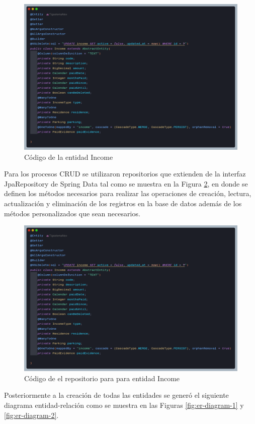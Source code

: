 \begin{figure}[H]
    \centering
    \includegraphics[width=1\textwidth]{resources/images/entity}
    \caption{Código de la entidad Income}
    \label{fig:entity}
\end{figure}

Para los procesos CRUD se utilizaron repositorios que extienden de la interfaz JpaRepository de Spring Data  tal como se muestra en la Figura \ref{fig:repository}, en donde se definen los métodos necesarios para realizar las operaciones de creación, lectura, actualización y eliminación de los registros en la base de datos además de los métodos personalizados que sean necesarios.

\begin{figure}[H]
    \centering
    \includegraphics[width=1\textwidth]{resources/images/entity}
    \caption{Código de el repositorio para para entidad Income}
    \label{fig:repository}
\end{figure}
Posteriormente a la creación de todas las entidades se generó el siguiente diagrama entidad-relación como se muestra en las Figuras \ref{fig:er-diagram-1} y \ref{fig:er-diagram-2}.

